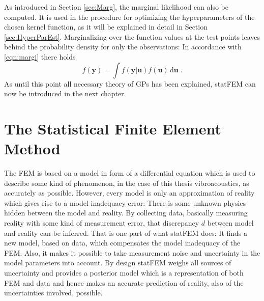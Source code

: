 \documentclass[%
  a4paper,oneside,%
  11pt,%
  smallchapters,
  style=printdev,
  extramargin,
  green,%
  rgb, <cmyk>
  ]{tubsbook}
\begin{document}
As introduced in Section \ref{sec:Marg}, the marginal likelihood can also be computed. It is used in the procedure for optimizing the hyperparameters of the chosen kernel function, as it will be explained in detail in Section \ref{sec:HyperParEst}. Marginalizing over the function values at the test points leaves behind the probability density for only the observations: In accordance with \eqref{eqn:margi} there holds
\begin{equation}
f(\bm{y}) = \int f(\bm{y}|\bm{u}) f(\bm{u}) \, \mathrm{d}\bm{u} \;.
\label{eqn:marginGP}
\end{equation}
As until this point all necessary theory of GPs has been explained, statFEM can now be introduced in the next chapter.







\section{The Statistical Finite Element Method}
The FEM is based on a model in form of a differential equation which is used to describe some kind of phenomenon, in the case of this thesis vibroacoustics, as accurately as possible. However, every model is only an approximation of reality which gives rise to a model inadequacy error: There is some unknown physics hidden between the model and reality. By collecting data, basically measuring reality with some kind of measurement error, that discrepancy $d$ between model and reality can be inferred. That is one part of what statFEM does: It finds a new model, based on data, which compensates the model inadequacy of the FEM. Also, it makes it possible to take measurement noise and uncertainty in the model parameters into account. By design statFEM weighs all sources of uncertainty and provides a posterior model which is a representation of both FEM and data and hence makes an accurate prediction of reality, also of the uncertainties involved, possible.
\end{document}
